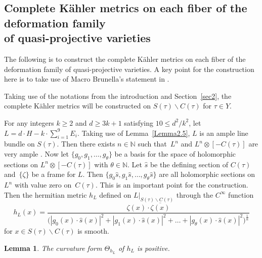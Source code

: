 \documentclass[pdftex]{sigma}
\numberwithin{equation}{section}
\newtheorem{Lemma}[Theorem]{Lemma}
\begin{document}
\subsection[Complete K\"ahler metrics on each fiber of the deformation family of quasi-projective varieties]{Complete K\"ahler metrics on each fiber of the deformation family\\ of quasi-projective varieties}

The following is to construct the complete K\"ahler metrics on each fiber of the deformation family of quasi-projective varieties. A key point for the construction here is to take use of Macro Brunella's statement in \cite{Marco}.

Taking use of the notations from the introduction and Section~\ref{sec2}, the complete K\"ahler metrics will be constructed on $S(\tau)\backslash C(\tau)$ for $\tau \in Y$.

For any integers $k\geq 2$ and $d \geq 3k+1$ satisfying $10 \leq d^2/k^2$, let $L=d\cdot H-k\cdot\sum _{i=1}^9 E_i$. Taking use of Lemma~\ref{Lemma2.5}, $L$ is an ample line bundle on $S(\tau)$. Then there exists $n\in \mathbb{N}$ such that~$L^n$ and $L^n\otimes [-C(\tau)]$ are very ample \cite{Phillip}. Now let $ \{ g_0,g_1,\dots ,g_{\theta} \}$ be a basis for the space of holomorphic sections on $L^n\otimes [-C(\tau)]$ with $\theta \in \mathbb{N}$. Let $\hat{s}$ be the defining section of $C(\tau)$ and~$ \{ \zeta \}$ be a frame for $L$. Then $ \{ g_0\hat{s},g_1\hat{s},\dots ,g_{\theta} \hat{s} \}$ are all holomorphic sections on $L^n$ with value zero on~$C(\tau)$. This is an important point for the construction. Then the hermitian metric $h_L$ defined on $L|_{S(\tau)\backslash C(\tau)}$ through the $C^\infty $ function
\[
h_L(x)=\frac{\zeta(x) \cdot \overline{\zeta (x)}}{\bigl(|g_0(x)\cdot \hat{s}(x)|^2+|g_1(x)\cdot \hat{s}(x)|^2+\dots +|g_{\theta}(x)\cdot \hat{s}(x)|^2\bigr)^{\frac{1}{n}}}
\]
for $x \in S(\tau)\backslash C(\tau)$ is smooth.

\begin{Lemma} \label{Lemma3.16}
The curvature form $\Theta_{h_L}$ of $h_L$ is positive.
\end{Lemma}
\end{document}

